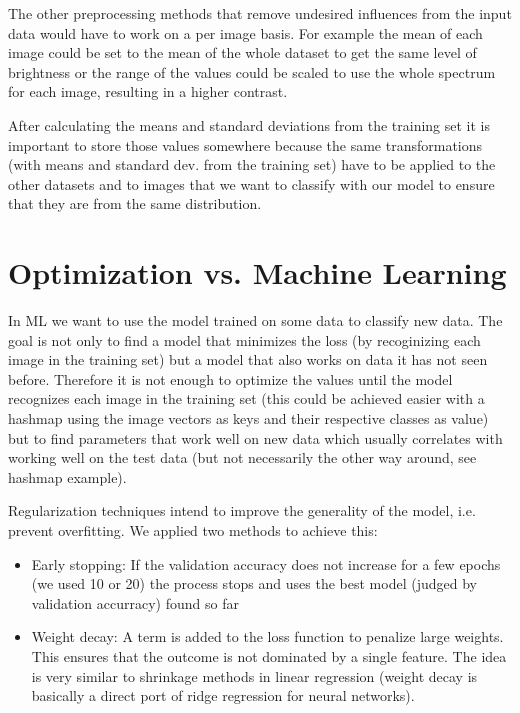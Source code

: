 The other preprocessing methods that remove undesired influences from the input data would have to work on a per image basis. For example the mean of each image could be set to the mean of the whole dataset to get the same level of brightness or the range of the values could be scaled to use the whole spectrum for each image, resulting in a higher contrast. 

After calculating the means and standard deviations from the training set it is important to store those values somewhere because the same transformations (with means and standard dev. from the training set) have to be applied to the other datasets and to images that we want to classify with our model to ensure that they are from the same distribution. 

\section{Optimization vs. Machine Learning}
In ML we want to use the model trained on some data to classify new data. The goal is not only to find a model that minimizes the loss (by recoginizing each image in the training set) but a model that also works on data it has not seen before. Therefore it is not enough to optimize the values until the model recognizes each image in the training set (this could be achieved easier with a hashmap using the image vectors as keys and their respective classes as value) but to find parameters that work well on new data which usually correlates with working well on the test data (but not necessarily the other way around, see hashmap example).

Regularization techniques intend to improve the generality of the model, i.e. prevent overfitting. We applied two methods to achieve this:
\begin{itemize}
\item Early stopping: If the validation accuracy does not increase for a few epochs (we used 10 or 20) the process stops and uses the best model (judged by validation accurracy) found so far	
\item Weight decay: A term is added to the loss function to penalize large weights. This ensures that the outcome is not dominated by a single feature. The idea is very similar to shrinkage methods in linear regression (weight decay is basically a direct port of ridge regression for neural networks). 
\end{itemize}
